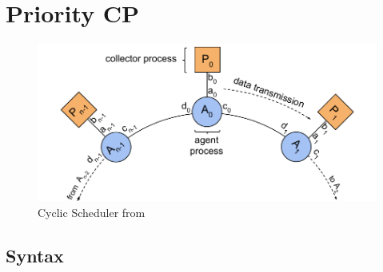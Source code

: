 \documentclass[main.tex]{subfiles}
\begin{document}
\section{Priority CP}

\begin{figure}[t]
  \centering
  \includegraphics[width=0.8\columnwidth]{scheduler}
  \vspace{-4mm}
  \caption{Cyclic Scheduler from \cite{DardhaG18}}
  \label{fig:scheduler}
  \vspace{-4mm}
  \end{figure}

\subsection{Syntax}
\end{document}
